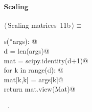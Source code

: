 \documentclass[11pt,oneside]{article}	%
\begin{document}
\paragraph{Scaling}
\begin{flushleft} \small \label{scrap22}
\protect{}$\langle\,$Scaling matrices\nobreak\ {\footnotesize 11b}$\,\rangle\equiv$
\vspace{-1ex}
\begin{list}{}{} \item
\mbox{}\verb@def s(*args): @\\
\mbox{}\verb@   d = len(args)@\\
\mbox{}\verb@   mat = scipy.identity(d+1)@\\
\mbox{}\verb@   for k in range(d): @\\
\mbox{}\verb@      mat[k,k] = args[k]@\\
\mbox{}\verb@   return mat.view(Mat)@\\
\mbox{}\verb@@{\NWsep}
\end{list}
\vspace{-1ex}
\footnotesize\addtolength{\baselineskip}{-1ex}
\begin{list}{}{\setlength{\itemsep}{-\parsep}\setlength{\itemindent}{-\leftmargin}}
\item \NWtxtMacroRefIn\ .
\end{list}
\end{flushleft}
\end{document}
